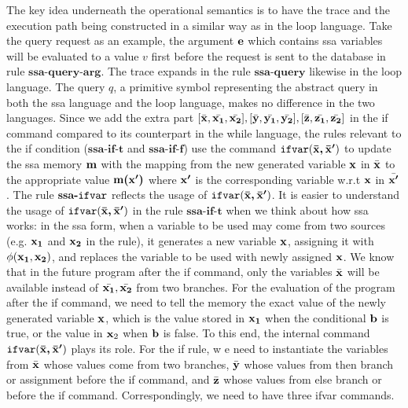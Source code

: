 \documentclass[a4paper,11pt]{article}
\begin{document}
{
The key idea underneath the operational semantics is to have the trace and the execution path being constructed in a similar way as in the loop language.
Take the query request as an example, the argument $\boldsymbol{\mathbf{e}}$ which contains ssa variables will be evaluated to a value $v$ first before the request is sent to the database in rule $\textbf{ssa-query-arg}$. 
The trace expands in the rule $\textbf{ssa-query}$ likewise in the loop language. 
The query $q$, a primitive symbol representing the abstract query in both the ssa language and  the loop language, makes no difference in the two languages. 
Since we add the extra part $[\bar{\boldsymbol{\mathbf{x}}}, \bar{\boldsymbol{\mathbf{x_1}}}, \bar{\boldsymbol{\mathbf{x_2}}}] ,[\bar{\boldsymbol{\mathbf{y}}}, \bar{\boldsymbol{\mathbf{y_1}}}, \bar{\boldsymbol{\mathbf{y_2}}}] ,[\bar{\boldsymbol{\mathbf{z}}},\bar{\boldsymbol{\mathbf{z_1}}}, \bar{\boldsymbol{\mathbf{z_2}}}]  $ 
in the if command compared to its counterpart in the while language, 
the rules relevant to the if condition ($\textbf{ssa-if-t}$ and $\textbf{ssa-if-f}$) use the command $\mathtt{ifvar}(\boldsymbol{\mathbf{\bar{x}, \bar{x}'}})$ to update the ssa memory $\boldsymbol{\mathbf{m}}$ with the mapping from the new generated variable $\boldsymbol{\mathbf{x}}$ in $\bar{\boldsymbol{\mathbf{x}}}$ to the appropriate value $\boldsymbol{\mathbf{m(x')}}$ where $\boldsymbol{\mathbf{x'}}$ is the corresponding variable w.r.t $\boldsymbol{\mathbf{x}}$ in $\bar{\boldsymbol{\mathbf{x'}}}$.
%
The rule $\textbf{ssa-\ensuremath{\mathtt{ifvar}}}$ reflects the usage of $\mathtt{ifvar}(\boldsymbol{\mathbf{\bar{x}, \bar{x}'}})$.
%
It is easier to understand the usage of $\mathtt{ifvar}(\boldsymbol{\mathbf{\bar{x}, \bar{x}'}})$ in the rule $\textbf{ssa-if-t}$ when we think about how ssa works: 
in the ssa form, when a variable to be used may come from two sources (e.g. $\boldsymbol{\mathbf{x_1}}$ and $\boldsymbol{\mathbf{x_2}}$ in the rule), it generates a new variable $\boldsymbol{\mathbf{x}}$, assigning it with $\phi(\boldsymbol{\mathbf{x_1}}, \boldsymbol{\mathbf{x_2}})$,  and replaces the variable to be used with newly assigned $\boldsymbol{\mathbf{x}}$. 
We know that in the future program after the if command, 
only the variables $\bar{\boldsymbol{\mathbf{x}}}$ will be available instead of $\bar{\boldsymbol{\mathbf{x_1}}}, \bar{\boldsymbol{\mathbf{x_2}}}$ from two branches.
For the evaluation of the program after the if command, we need to tell the memory the exact value of the newly generated variable $\boldsymbol{\mathbf{x}}$, which is the value stored in $\boldsymbol{\mathbf{x_1}}$ when the conditional $\boldsymbol{\mathbf{b}}$ is true, 
or the value in $\boldsymbol{\mathbf{x}}_2$ when $\boldsymbol{\mathbf{b}}$ is false. To this end, the internal command $\mathtt{ifvar}(\boldsymbol{\mathbf{\bar{x}, \bar{x}'}})$ plays its role. 
For the if rule, w
e need to instantiate the variables from $\bar{\boldsymbol{\mathbf{x}}}$ whose values come from two branches, 
$\bar{\boldsymbol{\mathbf{y}}}$ whose values from then branch or assignment before the if command, and $\bar{\boldsymbol{\mathbf{z}}}$ whose values from else branch or before the if command. 
Correspondingly, we need to have three ifvar commands.   
}
\end{document}
